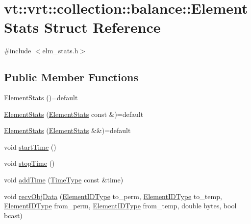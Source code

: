 \hypertarget{structvt_1_1vrt_1_1collection_1_1balance_1_1_element_stats}{}\section{vt\+:\+:vrt\+:\+:collection\+:\+:balance\+:\+:Element\+Stats Struct Reference}
\label{structvt_1_1vrt_1_1collection_1_1balance_1_1_element_stats}


{\ttfamily \#include $<$elm\+\_\+stats.\+h$>$}

\subsection*{Public Member Functions}
\begin{DoxyCompactItemize}
\item 
\hyperlink{structvt_1_1vrt_1_1collection_1_1balance_1_1_element_stats_a4d88e9b2f7981d7f98889fa9bea01d73}{Element\+Stats} ()=default
\item 
\hyperlink{structvt_1_1vrt_1_1collection_1_1balance_1_1_element_stats_a7d0f1ce4fdc1450c45da136137d11ece}{Element\+Stats} (\hyperlink{structvt_1_1vrt_1_1collection_1_1balance_1_1_element_stats}{Element\+Stats} const \&)=default
\item 
\hyperlink{structvt_1_1vrt_1_1collection_1_1balance_1_1_element_stats_ae99f86097df6e28374b3a0e7f8ef5b72}{Element\+Stats} (\hyperlink{structvt_1_1vrt_1_1collection_1_1balance_1_1_element_stats}{Element\+Stats} \&\&)=default
\item 
void \hyperlink{structvt_1_1vrt_1_1collection_1_1balance_1_1_element_stats_ad9489efefecb108cc677812f89475b9f}{start\+Time} ()
\item 
void \hyperlink{structvt_1_1vrt_1_1collection_1_1balance_1_1_element_stats_aca12581fe6da436d4d8dbd76776b7d8a}{stop\+Time} ()
\item 
void \hyperlink{structvt_1_1vrt_1_1collection_1_1balance_1_1_element_stats_aadebe326db328893e6a38413d647c9a1}{add\+Time} (\hyperlink{namespacevt_a876a9d0cd5a952859c72de8a46881442}{Time\+Type} const \&time)
\item 
void \hyperlink{structvt_1_1vrt_1_1collection_1_1balance_1_1_element_stats_afdd59d341ddd577a4652027b132a7c06}{recv\+Obj\+Data} (\hyperlink{namespacevt_1_1vrt_1_1collection_1_1balance_a14c8d2c972f2913aa3f1636e5be0a120}{Element\+I\+D\+Type} to\+\_\+perm, \hyperlink{namespacevt_1_1vrt_1_1collection_1_1balance_a14c8d2c972f2913aa3f1636e5be0a120}{Element\+I\+D\+Type} to\+\_\+temp, \hyperlink{namespacevt_1_1vrt_1_1collection_1_1balance_a14c8d2c972f2913aa3f1636e5be0a120}{Element\+I\+D\+Type} from\+\_\+perm, \hyperlink{namespacevt_1_1vrt_1_1collection_1_1balance_a14c8d2c972f2913aa3f1636e5be0a120}{Element\+I\+D\+Type} from\+\_\+temp, double bytes, bool bcast)

\end{DoxyCompactItemize}
